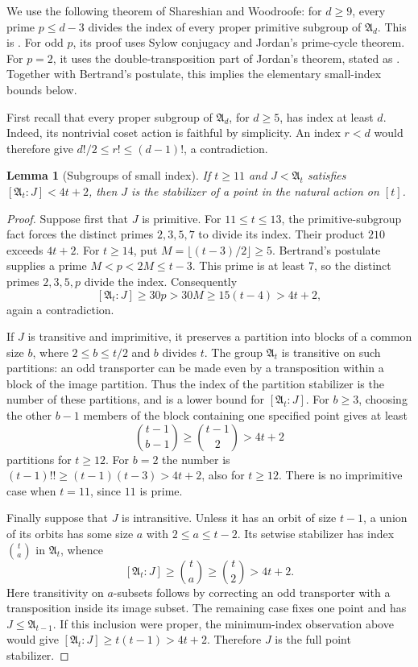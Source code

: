 \documentclass[11pt,a4paper]{article}
\newtheorem{lemma}[theorem]{Lemma}
\theoremstyle{definition}
\theoremstyle{remark}
\newcommand{\Alt}{\mathfrak A}
\begin{document}
We use the following theorem of Shareshian and Woodroofe:
for $d\ge9$, every prime $p\le d-3$ divides the index of every
proper primitive subgroup of $\Alt_d$. This is
\cite[Lemma~4.2, p.~230]{SW}. For odd $p$, its proof uses Sylow
conjugacy and Jordan's prime-cycle theorem. For $p=2$, it uses the
double-transposition part of Jordan's theorem, stated as
\cite[Theorem~4.1(2)]{SW}. Together with Bertrand's postulate, this
implies the elementary small-index bounds below.

First recall that every proper subgroup of $\Alt_d$, for $d\ge5$, has
index at least $d$. Indeed, its nontrivial coset action is faithful by
simplicity. An index $r<d$ would therefore give
$d!/2\le r!\le(d-1)!$, a contradiction.

\begin{lemma}[Subgroups of small index]\label{lem:small-index}
If $t\ge11$ and $J<\Alt_t$ satisfies $[\Alt_t:J]<4t+2$, then $J$ is the
stabilizer of a point in the natural action on $[t]$.
\end{lemma}
\begin{proof}
Suppose first that $J$ is primitive. For $11\le t\le13$, the
primitive-subgroup fact forces the distinct primes $2,3,5,7$ to divide
its index. Their product $210$ exceeds $4t+2$. For $t\ge14$, put
$M=\lfloor(t-3)/2\rfloor\ge5$. Bertrand's postulate supplies a prime
$M<p<2M\le t-3$. This prime is at least $7$, so the distinct primes
$2,3,5,p$ divide the index. Consequently
\[
 [\Alt_t:J]\ge30p>30M\ge15(t-4)>4t+2,
\]
again a contradiction.

If $J$ is transitive and imprimitive, it preserves a partition into
blocks of a common size $b$, where $2\le b\le t/2$ and $b$ divides $t$.
The group $\Alt_t$ is transitive on such partitions: an odd transporter
can be made even by a transposition within a block of the image
partition. Thus the index of the partition stabilizer is the number of
these partitions, and is a lower bound for $[\Alt_t:J]$. For $b\ge3$,
choosing the other $b-1$ members of the block containing one specified
point gives at least
\[
 \binom{t-1}{b-1}\ge\binom{t-1}{2}>4t+2
\]
partitions for $t\ge12$. For $b=2$ the number is
$(t-1)!!\ge(t-1)(t-3)>4t+2$, also for $t\ge12$.
There is no imprimitive case when $t=11$, since $11$ is prime.

Finally suppose that $J$ is intransitive. Unless it has an orbit of
size $t-1$, a union of its orbits has some size $a$ with
$2\le a\le t-2$. Its setwise stabilizer has index $\binom ta$ in
$\Alt_t$, whence
\[
 [\Alt_t:J]\ge\binom ta\ge\binom t2>4t+2.
\]
Here transitivity on $a$-subsets follows by correcting an odd
transporter with a transposition inside its image subset. The remaining
case fixes one point and has $J\le\Alt_{t-1}$. If this inclusion were
proper, the minimum-index observation above would give
$[\Alt_t:J]\ge t(t-1)>4t+2$. Therefore $J$ is the full point stabilizer.
\end{proof}
\end{document}
